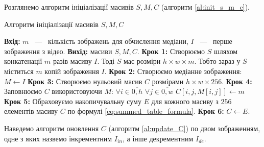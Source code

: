 Розглянемо алгоритм ініціалізації масивів $S, M, C$ (алгоритм \ref{al:init_s_m_c}).
\begin{algorithm}[H]
    \caption{Алгоритм ініціалізації масивів $S, M, C$}
    \begin{algorithmic}
        \State \textbf{Вхід:} $m$ ~---~ кількість зображень для обчислення медіани,
        $I$ ~---~ перше зображення з відео.
        \State \textbf{Вихід:} масиви $S, M, C$.
        \State \textbf{Крок 1:} Створюємо $S$ шляхом конкатенації $m$ разів масиву $I$.
        Тоді $S$ має розміри $h \times w \times m$. Тобто зараз у $S$ міститься
        $m$ копій зображення $I$.
        \State \textbf{Крок 2:} Створюємо медіанне зображення: $M \gets I$
        \State \textbf{Крок 3:} Створюємо нульовий масив $C$ розмірами $h \times w \times 256$.
        \State \textbf{Крок 4:} Заповнюємо $C$ використовуючи $M$:
        \State $\forall i \in \overline{0,h}$
        \State \qquad $\forall j \in \overline{0,w}$
        \State \qquad \qquad $C[i,j,M[i,j]] \gets m$
        \State \textbf{Крок 5:} Обраховуємо накопичувальну суму $E$ для кожного масиву з $256$ елементів
        масиву $C$ по формулі \eqref{eq:summed_table_formula}.
        \State \textbf{Крок 6:} $C \gets E$.
    \end{algorithmic}
    \label{al:init_s_m_c}
\end{algorithm}

Наведемо алгоритм оновлення $C$ (алгоритм \ref{al:update_C}) по двом зображенням,
одне з яких назвемо інкрементним $I_{in}$, а інше декрементним $I_{de}$.

